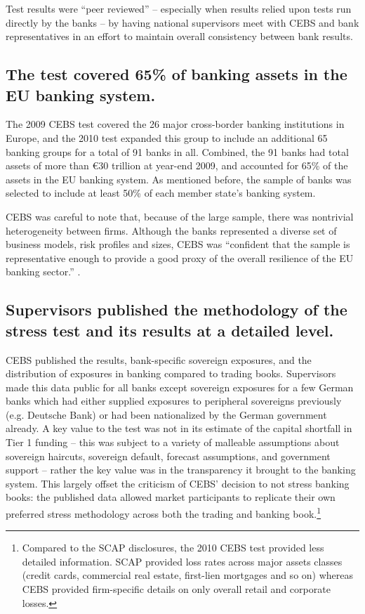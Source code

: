 \documentclass[12pt]{article}
\begin{document}
Test results were ``peer reviewed'' -- especially when results relied upon tests run directly by the banks -- by having national supervisors meet with CEBS and bank representatives in an effort to maintain overall consistency between bank results. \citep{Methodology}

\subsection{The test covered 65\% of banking assets in the EU banking system.}

The 2009 CEBS test covered the 26 major cross-border banking institutions in Europe, and the 2010 test expanded this group to include an additional 65 banking groups for a total of 91 banks in all. Combined, the 91 banks had total assets of more than \euro{30} trillion at year-end 2009, and accounted for 65\% of the assets in the EU banking system. As mentioned before, the sample of banks was selected to include at least 50\% of each member state's banking system.

CEBS was careful to note that, because of the large sample, there was nontrivial heterogeneity between firms. Although the banks represented a diverse set of business models, risk profiles and sizes, CEBS was ``confident that the sample is representative enough to provide a good proxy of the overall resilience of the EU banking sector.'' \citep{Methodology}.

\subsection{Supervisors published the methodology of the stress test and its results at a detailed level.}

CEBS published the results, bank-specific sovereign exposures, and the distribution of exposures in banking compared to trading books. Supervisors made this data public for all banks except sovereign exposures for a few German banks which had either supplied exposures to peripheral sovereigns previously (e.g. Deutsche Bank) or had been nationalized by the German government already. A key value to the test was not in its estimate of the capital shortfall in Tier 1 funding -- this was subject to a variety of malleable assumptions about sovereign haircuts, sovereign default, forecast assumptions, and government support -- rather the key value was in the transparency it brought to the banking system. This largely offset the criticism of CEBS' decision to not stress banking books: the published data allowed market participants to replicate their own preferred stress methodology across both the trading and banking book.\footnote{Compared to the SCAP disclosures, the 2010 CEBS test provided less detailed information. SCAP provided loss rates across major assets classes (credit cards, commercial real estate, first-lien mortgages and so on) whereas CEBS provided firm-specific details on only overall retail and corporate losses.}
\end{document}
